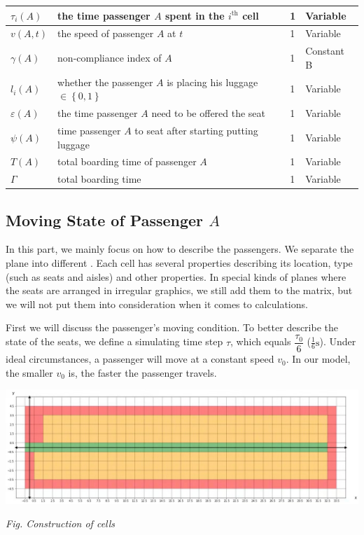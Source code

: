 \documentclass{article}
\newcommand{\cB}{\color{allandarkblue}Constant B\color{black}}
\newcommand{\varr}{\color{allanpurple}Variable\color{black}}
\begin{document}
\begin{center}
\begin{tabular}{|l|l|l|l|}
		$\tau _i\left( A \right)$&the time passenger $A$ spent in the $i^\text{th}$ cell&1&\varr\\
		\hline
		$v\left( A,t \right)$&the speed of passenger $A$ at $t$&1&\varr\\
		\hline
		$\gamma \left( A \right)$&non-compliance index of \(A\)&1&\cB\\
		\hline
		$l_i\left( A \right)$&whether the passenger $A$ is placing his luggage \(\in\left\{0,1\right\}\)&1&\varr\\
		\hline
		$\varepsilon \left( A \right)$&the time passenger $A$ need to be offered the seat&1&\varr\\
		\hline
		$\psi \left( A \right)$&time passenger $A$ to seat after starting putting luggage&1&\varr\\
		\hline
		$T\left( A \right)$&total boarding time of passenger $A$&1&\varr\\
		\hline
		$\Gamma$ &total boarding time&1&\varr\\
		\hline
	\end{tabular}
	\end{center}
	\subsection{Moving State of Passenger $A$}
	In this part, we mainly focus on how to describe the passengers. We separate the plane into different . Each cell has several properties describing its location, type (such as seats and aisles) and other properties. In special kinds of planes where the seats are arranged in irregular graphics, we still add them to the matrix, but we will not put them into consideration when it comes to calculations.

	First we will discuss the passenger's moving condition. To better describe the state of the seats, we define a simulating time step $\tau$, which equals $\dfrac{\tau_0}{6}$ ($\frac{1}{6}\mathrm{s}$). Under ideal circumstances, a passenger will move at a constant speed $v_0$. In our model, the smaller $v_0$ is, the faster the passenger travels.

	\begin{center}
		\includegraphics[width = 14cm]{cell_visualization.jpg}

		\small\textit{Fig. Construction of cells}
	\end{center}
\end{document}
